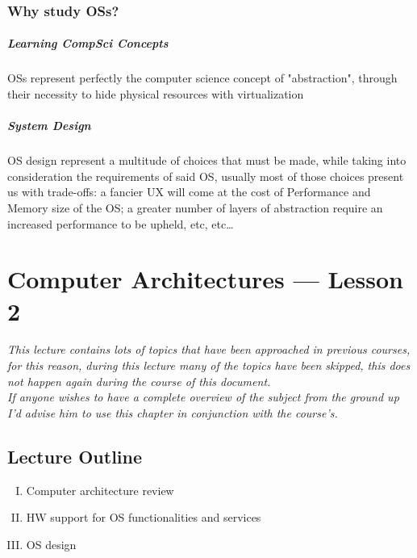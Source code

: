 \documentclass[openright, twoside]{report}
\theoremstyle{definition}
\theoremstyle{example}
\begin{document}
	\subsection{Why study OSs?}
	\paragraph{Learning CompSci Concepts} OSs represent perfectly the computer science concept of "abstraction", through
	their necessity to hide physical resources with virtualization

	\paragraph{System Design} OS design represent a multitude of choices that must be made, while taking into
	consideration the requirements of said OS, usually most of those choices present us with trade-offs: a fancier UX
	will come at the cost of Performance and Memory size of the OS; a greater number of layers of abstraction require an
	increased performance to be upheld, etc, etc\dots

\chapter{Computer Architectures --- Lesson 2}

\begin{center}
        
    \textit{\small This lecture contains lots of topics that have been approached in previous courses,
	for this reason, during this lecture many of the topics have been skipped, this \emph{does not} happen again 
	during the course of this document.}\\
	
	\textit{\small If anyone wishes to have a complete overview of the subject from the ground up I'd advise him to use this chapter 
	in conjunction with the course's.
	}
	    
    \end{center}

	\section{Lecture Outline}
	\begin{enumerate}[I.]
		\item Computer architecture review
		\item HW support for OS functionalities and services
		\item OS design
	\end{enumerate}
\end{document}
